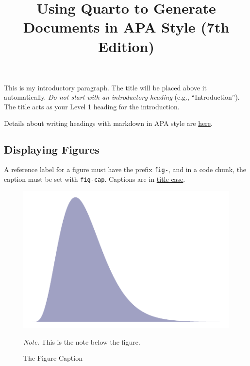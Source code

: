 \documentclass[
  jou,
  floatsintext,
  longtable,
  nolmodern,
  notxfonts,
  notimes,
  colorlinks=true,linkcolor=blue,citecolor=blue,urlcolor=blue]{apa7}
\title{Using Quarto to Generate Documents in APA Style (7th Edition)}
\begin{document}
\maketitle


\setcounter{secnumdepth}{-\maxdimen} %

\setlength\LTleft{0pt}


This is my introductory paragraph. The title will be placed above it
automatically. \emph{Do not start with an introductory heading} (e.g.,
``Introduction''). The title acts as your Level 1 heading for the
introduction.

Details about writing headings with markdown in APA style are
\href{https://wjschne.github.io/apaquarto/writing.html\#headings-in-apa-style}{here}.

\subsection{Displaying Figures}\label{displaying-figures}

A reference label for a figure must have the prefix \texttt{fig-}, and
in a code chunk, the caption must be set with \texttt{fig-cap}. Captions
are in
\href{https://apastyle.apa.org/style-grammar-guidelines/capitalization/title-case}{title
case}.

\begin{figure}[!htbp]

{\caption{{The Figure Caption}{\label{fig-myplot}}}}

\includegraphics{example_files/figure-pdf/fig-myplot-1.pdf}

{\noindent \emph{Note.} This is the note below the figure.}

\end{figure}
\end{document}
